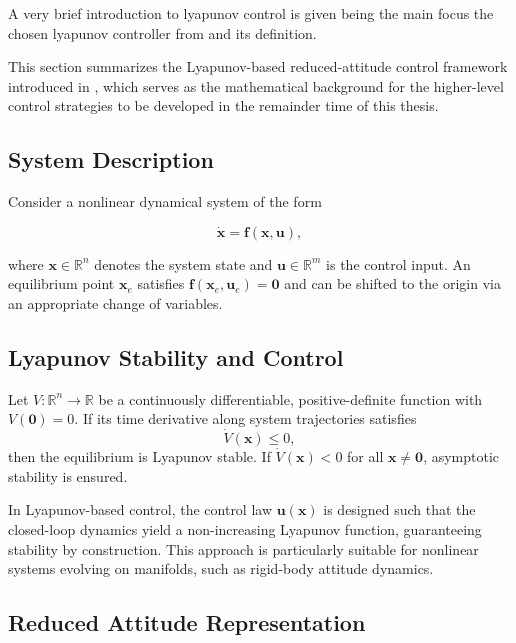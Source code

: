 A very brief introduction to lyapunov control is given being the main focus the chosen lyapunov controller from \cite{lyapunov_outer_loop_control} and its definition.  

This section summarizes the Lyapunov-based reduced-attitude control framework introduced in \cite{lyapunov_outer_loop_control}, which serves as the mathematical background for the higher-level control strategies to be developed in the remainder time of this thesis.

\subsection{System Description}

Consider a nonlinear dynamical system of the form

\begin{equation}
    \dot{\mathbf{x}} = \mathbf{f}(\mathbf{x}, \mathbf{u}),
\end{equation}

where $\mathbf{x} \in \mathbb{R}^n$ denotes the system state and $\mathbf{u} \in \mathbb{R}^m$ is the control input.  
An equilibrium point $\mathbf{x}_e$ satisfies $\mathbf{f}(\mathbf{x}_e, \mathbf{u}_e) = \mathbf{0}$ and can be shifted to the origin via an appropriate change of variables.

\subsection{Lyapunov Stability and Control}

Let $V : \mathbb{R}^n \rightarrow \mathbb{R}$ be a continuously differentiable, positive-definite function with $V(\mathbf{0}) = 0$.  
If its time derivative along system trajectories satisfies
\begin{equation}
    \dot{V}(\mathbf{x}) \le 0,
\end{equation}
then the equilibrium is Lyapunov stable. If $\dot{V}(\mathbf{x}) < 0$ for all $\mathbf{x} \neq \mathbf{0}$, asymptotic stability is ensured.

In Lyapunov-based control, the control law $\mathbf{u}(\mathbf{x})$ is designed such that the closed-loop dynamics yield a non-increasing Lyapunov function, guaranteeing stability by construction. This approach is particularly suitable for nonlinear systems evolving on manifolds, such as rigid-body attitude dynamics.

\subsection{Reduced Attitude Representation}


